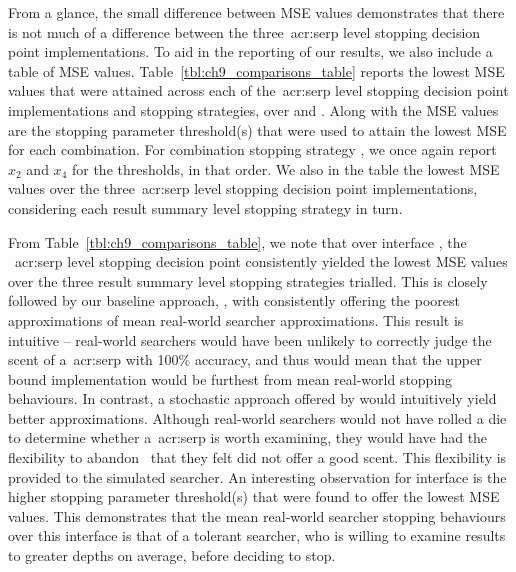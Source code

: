 From a glance, the small difference between MSE values demonstrates that there is not much of a difference between the three~\gls{acr:serp} level stopping decision point implementations. To aid in the reporting of our results, we also include a table of MSE values. Table~\ref{tbl:ch9_comparisons_table} reports the lowest MSE values that were attained across each of the~\gls{acr:serp} level stopping decision point implementations and stopping strategies, over  and . Along with the MSE values are the stopping parameter threshold(s) that were used to attain the lowest MSE for each combination. For combination stopping strategy , we once again report $x_2$ and $x_4$ for the thresholds, in that order. We also  in the table the lowest MSE values over the three~\gls{acr:serp} level stopping decision point implementations, considering each result summary level stopping strategy in turn.

From Table~\ref{tbl:ch9_comparisons_table}, we note that over interface , the ~\gls{acr:serp} level stopping decision point consistently yielded the lowest MSE values over the three result summary level stopping strategies trialled. This is closely followed by our baseline approach, , with  consistently offering the poorest approximations of mean real-world searcher approximations. This result is intuitive -- real-world searchers would have been unlikely to correctly judge the scent of a~\gls{acr:serp} with 100\% accuracy, and thus would mean that the upper bound  implementation would be furthest from mean real-world stopping behaviours. In contrast, a stochastic approach offered by  would intuitively yield better approximations. Although real-world searchers would not have rolled a die to determine whether a~\gls{acr:serp} is worth examining, they would have had the flexibility to abandon~ that they felt did not offer a good scent. This flexibility is provided to the  simulated searcher. An interesting observation for interface  is the higher stopping parameter threshold(s) that were found to offer the lowest MSE values. This demonstrates that the mean real-world searcher stopping behaviours over this interface is that of a tolerant searcher, who is willing to examine results to greater depths on average, before deciding to stop.

